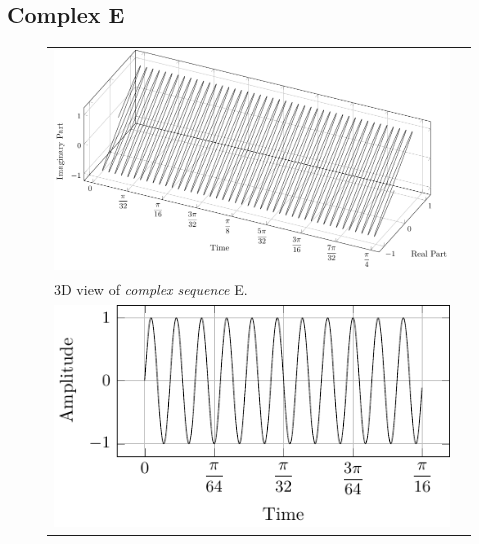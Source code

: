 \documentclass[../../course]{subfiles}
\begin{document}
\subsection{Complex E}

\begin{figure} [H]

    \renewcommand{\arraystretch}{0.75}
    \centering
    \begin{NiceTabularX} {\textwidth} {
            *{2}{>{\centering\arraybackslash}X}
        }

         {
             {
                \includegraphics[height = \textheight] {tikzpics/plotComplexE.pdf}
            }
        }

        &
        \\

         {
            \vbox{
                 {3D view of \emph{complex sequence} E.}
                \label{plt:cmplxE}
            }
        }

        &
        \\

         {
             {
                \includegraphics[height = \textheight] {tikzpics/plotShortX2.pdf}
            }
        }


\end{NiceTabularX}
\end{figure}
\end{document}
